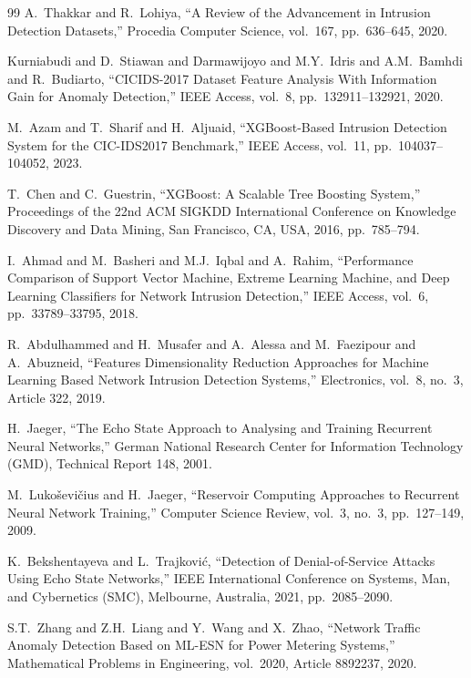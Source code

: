\documentclass[5p,times]{elsarticle}
\begin{document}
\begin{thebibliography}{99}
		A.\ Thakkar and R.\ Lohiya,
		``A Review of the Advancement in Intrusion Detection Datasets,''
		Procedia Computer Science,
		vol.\ 167,
		pp.\ 636--645,
		2020.
		
		Kurniabudi and D.\ Stiawan and Darmawijoyo and M.Y.\ Idris and A.M.\ Bamhdi and R.\ Budiarto,
		``CICIDS-2017 Dataset Feature Analysis With Information Gain for Anomaly Detection,''
		IEEE Access,
		vol.\ 8,
		pp.\ 132911--132921,
		2020.
		
		M.\ Azam and T.\ Sharif and H.\ Aljuaid,
		``XGBoost-Based Intrusion Detection System for the CIC-IDS2017 Benchmark,''
		IEEE Access,
		vol.\ 11,
		pp.\ 104037--104052,
		2023.
		
		T.\ Chen and C.\ Guestrin,
		``XGBoost: A Scalable Tree Boosting System,''
		Proceedings of the 22nd ACM SIGKDD International Conference on Knowledge Discovery and Data Mining,
		San Francisco, CA, USA,
		2016,
		pp.\ 785--794.
		
		I.\ Ahmad and M.\ Basheri and M.J.\ Iqbal and A.\ Rahim,
		``Performance Comparison of Support Vector Machine, Extreme Learning Machine, and Deep Learning Classifiers for Network Intrusion Detection,''
		IEEE Access,
		vol.\ 6,
		pp.\ 33789--33795,
		2018.
		
		R.\ Abdulhammed and H.\ Musafer and A.\ Alessa and M.\ Faezipour and A.\ Abuzneid,
		``Features Dimensionality Reduction Approaches for Machine Learning Based Network Intrusion Detection Systems,''
		Electronics,
		vol.\ 8,
		no.\ 3,
		Article 322,
		2019.
		
		H.\ Jaeger,
		``The Echo State Approach to Analysing and Training Recurrent Neural Networks,''
		German National Research Center for Information Technology (GMD),
		Technical Report 148,
		2001.
		
		M.\ Luko\v{s}evi\v{c}ius and H.\ Jaeger,
		``Reservoir Computing Approaches to Recurrent Neural Network Training,''
		Computer Science Review,
		vol.\ 3,
		no.\ 3,
		pp.\ 127--149,
		2009.
		
		K.\ Bekshentayeva and L.\ Trajkovi\'{c},
		``Detection of Denial-of-Service Attacks Using Echo State Networks,''
		IEEE International Conference on Systems, Man, and Cybernetics (SMC),
		Melbourne, Australia,
		2021,
		pp.\ 2085--2090.
		
		S.T.\ Zhang and Z.H.\ Liang and Y.\ Wang and X.\ Zhao,
		``Network Traffic Anomaly Detection Based on ML-ESN for Power Metering Systems,''
		Mathematical Problems in Engineering,
		vol.\ 2020,
		Article 8892237,
		2020.
		

\end{thebibliography}
\end{document}

